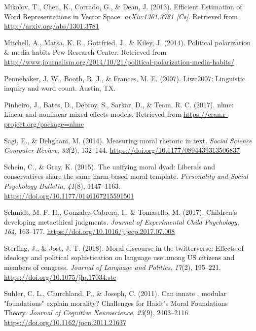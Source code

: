 \documentclass[
  english,
  man,floatsintext]{apa6}
\newlength{\cslhangindent}
\newlength{\cslentryspacingunit} %
\newenvironment{CSLReferences}[2] %
 {%
  \setlength{\parindent}{0pt}
  \ifodd #1
  \let\oldpar\par
  \def\par{\hangindent=\cslhangindent\oldpar}
  \fi
  \setlength{\parskip}{#2\cslentryspacingunit}
 }%
 {}
\begin{document}
\begin{CSLReferences}{1}{0}
\leavevmode{}%
Mikolov, T., Chen, K., Corrado, G., \& Dean, J. (2013). Efficient {Estimation} of {Word} {Representations} in {Vector} {Space}. \emph{arXiv:1301.3781 {[}Cs{]}}. Retrieved from \url{http://arxiv.org/abs/1301.3781}

\leavevmode{}%
Mitchell, A., Matsa, K. E., Gottfried, J., \& Kiley, J. (2014). {Political polarization {\&} media habits \textbar{} Pew Research Center}. Retrieved from \url{http://www.journalism.org/2014/10/21/political-polarization-media-habits/}

\leavevmode{}%
Pennebaker, J. W., Booth, R. J., \& Frances, M. E. (2007). {Liwc2007: Linguistic inquiry and word count}. Austin, TX.

\leavevmode{}%
Pinheiro, J., Bates, D., Debroy, S., Sarkar, D., \& Team, R. C. (2017). {nlme: Linear and nonlinear mixed effects models}. Retrieved from \url{https://cran.r-project.org/package=nlme}

\leavevmode{}%
Sagi, E., \& Dehghani, M. (2014). Measuring moral rhetoric in text. \emph{Social Science Computer Review}, \emph{32}(2), 132--144. \url{https://doi.org/10.1177/0894439313506837}

\leavevmode{}%
Schein, C., \& Gray, K. (2015). The unifying moral dyad: Liberals and conservatives share the same harm-based moral template. \emph{Personality and Social Psychology Bulletin}, \emph{41}(8), 1147--1163. \url{https://doi.org/10.1177/0146167215591501}

\leavevmode{}%
Schmidt, M. F. H., Gonzalez-Cabrera, I., \& Tomasello, M. (2017). {Children's developing metaethical judgments}. \emph{Journal of Experimental Child Psychology}, \emph{164}, 163--177. \url{https://doi.org/10.1016/j.jecp.2017.07.008}

\leavevmode{}%
Sterling, J., \& Jost, J. T. (2018). Moral discourse in the twitterverse: Effects of ideology and political sophistication on language use among US citizens and members of congress. \emph{Journal of Language and Politics}, \emph{17}(2), 195--221. \url{https://doi.org/10.1075/jlp.17034.ste}

\leavevmode{}%
Suhler, C. L., Churchland, P., \& Joseph, C. (2011). Can innate , modular "foundations" explain morality? Challenges for {H}aidt's {M}oral {F}oundations {T}heory. \emph{Journal of Cognitive Neuroscience}, \emph{23}(9), 2103--2116. \url{https://doi.org/10.1162/jocn.2011.21637}


\end{CSLReferences}
\end{document}
